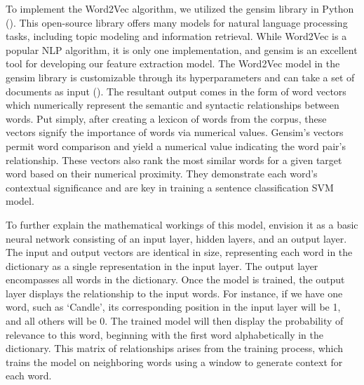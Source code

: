 \documentclass[english,bachelor]{swsLeipzig}
\begin{document}
To implement the Word2Vec algorithm, we utilized the gensim library in Python (\citet{rehurek:2022}). This open-source library offers 
many models for natural language processing tasks, including topic modeling and information retrieval. While Word2Vec is a popular NLP algorithm, it is only one implementation, and gensim is an excellent tool for developing our feature extraction model. The Word2Vec model in the gensim library is customizable through its hyperparameters and can take a set of documents as input (\citet{rehurek:word2vec}). The resultant output comes in the form of word vectors which numerically represent the semantic and syntactic relationships between words. Put simply, after creating a lexicon of words from the corpus, these vectors signify the importance of words via numerical values. Gensim's vectors permit word comparison and yield a numerical value indicating the word pair's relationship. These vectors also rank the most similar words for a given target word based on their numerical proximity. They demonstrate each word's contextual significance and are key in training a sentence classification SVM model.

To further explain the mathematical workings of this model, envision it as a basic neural network consisting of an 
input layer, hidden layers, and an output layer.  The input and output vectors are identical in size, representing each word in the dictionary as a single representation in the input layer. The output layer encompasses all words in the dictionary. Once the model is trained, the output layer displays the relationship to the input words. For instance, if we have one word, such as `Candle', its corresponding position in the input layer will be 1, and all others will be 0. The trained model will then display the probability of relevance to this word, beginning with the first word alphabetically in the dictionary. This matrix of relationships arises from the training process, which trains the model on neighboring words using a window to generate context for each word.
\end{document}

